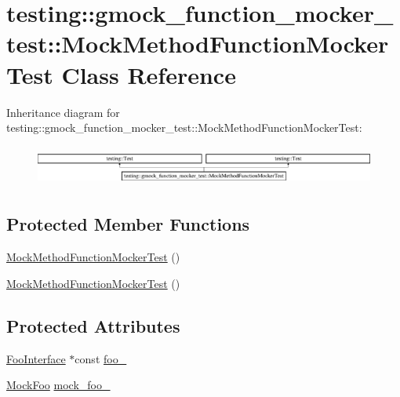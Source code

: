 \hypertarget{classtesting_1_1gmock__function__mocker__test_1_1_mock_method_function_mocker_test}{}\section{testing\+::gmock\+\_\+function\+\_\+mocker\+\_\+test\+::Mock\+Method\+Function\+Mocker\+Test Class Reference}
\label{classtesting_1_1gmock__function__mocker__test_1_1_mock_method_function_mocker_test}
Inheritance diagram for testing\+::gmock\+\_\+function\+\_\+mocker\+\_\+test\+::Mock\+Method\+Function\+Mocker\+Test\+:\begin{figure}[H]
\begin{center}
\leavevmode
\includegraphics[height=1.339713cm]{de/de4/classtesting_1_1gmock__function__mocker__test_1_1_mock_method_function_mocker_test}
\end{center}
\end{figure}
\subsection*{Protected Member Functions}
\begin{DoxyCompactItemize}
\item 
\mbox{\hyperlink{classtesting_1_1gmock__function__mocker__test_1_1_mock_method_function_mocker_test_a56214e594f4ca536616b625a6e211650}{Mock\+Method\+Function\+Mocker\+Test}} ()
\item 
\mbox{\hyperlink{classtesting_1_1gmock__function__mocker__test_1_1_mock_method_function_mocker_test_a56214e594f4ca536616b625a6e211650}{Mock\+Method\+Function\+Mocker\+Test}} ()
\end{DoxyCompactItemize}
\subsection*{Protected Attributes}
\begin{DoxyCompactItemize}
\item 
\mbox{\hyperlink{classtesting_1_1gmock__function__mocker__test_1_1_foo_interface}{Foo\+Interface}} $\ast$const \mbox{\hyperlink{classtesting_1_1gmock__function__mocker__test_1_1_mock_method_function_mocker_test_ae80fd97abe91023861c28008140e8b79}{foo\+\_\+}}
\item 
\mbox{\hyperlink{classtesting_1_1gmock__function__mocker__test_1_1_mock_foo}{Mock\+Foo}} \mbox{\hyperlink{classtesting_1_1gmock__function__mocker__test_1_1_mock_method_function_mocker_test_a166e26a4ef39d8a0ddf1e271f40189db}{mock\+\_\+foo\+\_\+}}
\end{DoxyCompactItemize}
